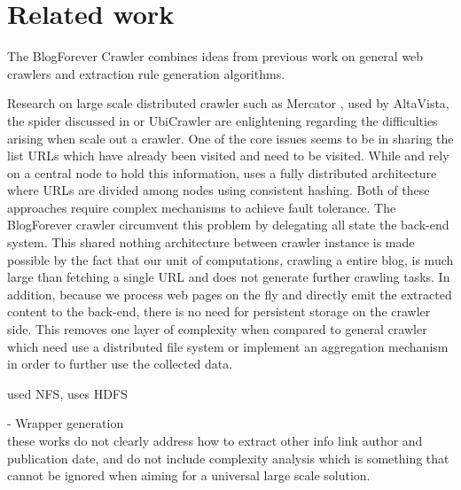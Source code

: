 \section{Related work}
\label{relatedwork}


The BlogForever Crawler combines ideas from previous work on general web crawlers and extraction rule generation algorithms.

Research on large scale distributed crawler such as Mercator \cite{najork2001}, used by AltaVista, the spider discussed in \cite{shkapenyuk2002} or UbiCrawler \cite{boldi2003} are enlightening regarding the difficulties arising when scale out a crawler. One of the core issues seems to be in sharing the list URLs which have already been visited and need to be visited. While \cite{najork2001} and \cite{shkapenyuk2002} rely on a central node to hold this information, \cite{boldi2003} uses a fully distributed architecture where URLs are divided among nodes using consistent hashing. Both of these approaches require complex mechanisms to achieve fault tolerance. The BlogForever crawler circumvent this problem by delegating all state the back-end system. This shared nothing architecture between crawler instance is made possible by the fact that our unit of computations, crawling a entire blog, is much large than fetching a single URL and does not generate further crawling tasks. In addition, because we process web pages on the fly and directly emit the extracted content to the back-end, there is no need for persistent storage on the crawler side. This removes one layer of complexity when compared to general crawler which need use a distributed file system or implement an aggregation mechanism in order to further use the collected data.

\cite{shkapenyuk2002} used NFS, \cite{berger2011} uses HDFS

- Wrapper generation\\
these works do not clearly address how to extract other info link author and publication date, and do not include complexity analysis which is something that cannot be ignored when aiming for a universal large scale solution.


